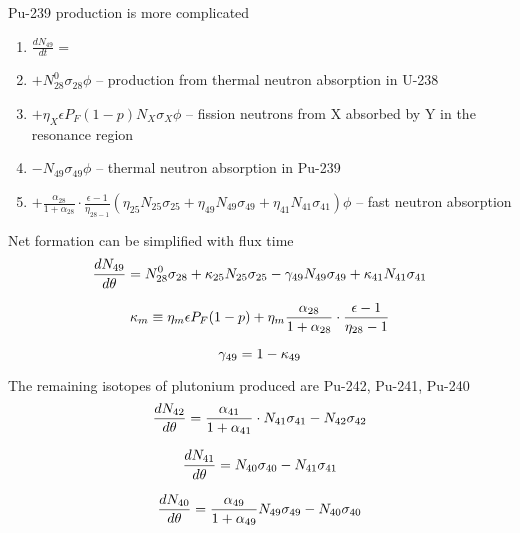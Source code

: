 \documentclass[aspectratio=1610,pdftex,dvipsnames,compress,xcolor={dvipsnames}]{beamer}
\begin{document}
\begin{frame}{Pu-239 production is more complicated}
    \begin{enumerate}[series=outerlist,topsep=0pt,itemsep=21pt,leftmargin=*,label=(\arabic*)]
        \item[]$\frac{dN_{49}}{dt} = $
        \item[]$+ N^0_{28}\sigma_{28}\phi$ -- production from thermal neutron absorption in U-238
        \item[]$+ \eta_{X}\epsilon P_F (1-p) N_{X}\sigma_{X}\phi$ -- fission neutrons from X absorbed by Y in the resonance region 
        \item[]$- N_{49}\sigma_{49}\phi$ -- thermal neutron absorption in Pu-239
        \item[]$+ \frac{\alpha_{28}}{1 + \alpha_{28}}\cdot\frac{\epsilon-1}{\eta_{28-1}}(\eta_{25}N_{25}\sigma_{25} + \eta_{49}N_{49}\sigma_{49} + \eta_{41}N_{41}\sigma_{41})\phi$ -- fast neutron absorption
    \end{enumerate}
\end{frame}


\begin{frame}{Net formation can be simplified with flux time}
    \begin{equation}
        \LARGE
        \frac{dN_{49}}{d\theta}=N_{28}^0\sigma_{28} + \kappa_{25}N_{25}\sigma_{25}-\gamma_{49}N_{49}\sigma_{49} + \kappa_{41}N_{41}\sigma_{41}
    \end{equation}
    
    \begin{equation}
        \LARGE
        \kappa_m \equiv\eta_m\epsilon P_F(1-p) + \eta_m\frac{\alpha_{28}}{1 + \alpha_{28}}\cdot\frac{\epsilon-1}{\eta_{28}-1}
    \end{equation}
    
    \begin{equation}
        \LARGE
        \gamma_{49} = 1 - \kappa_{49}
    \end{equation}
\end{frame}


\begin{frame}{The remaining isotopes of plutonium produced are Pu-242, Pu-241, Pu-240}
    \begin{equation}
        \LARGE
        \frac{dN_{42}}{d\theta}=\frac{\alpha_{41}}{1 + \alpha_{41}}\cdot N_{41}\sigma_{41}-N_{42}\sigma_{42}
    \end{equation}
    
    \begin{equation}
        \LARGE
        \frac{dN_{41}}{d\theta}=N_{40}\sigma_{40}-N_{41}\sigma_{41}
    \end{equation}
    
    \begin{equation}
        \LARGE
        \frac{dN_{40}}{d\theta}=\frac{\alpha_{49}}{1 + \alpha_{49}}N_{49}\sigma_{49}-N_{40}\sigma_{40}
    \end{equation}
\end{frame}
\end{document}
